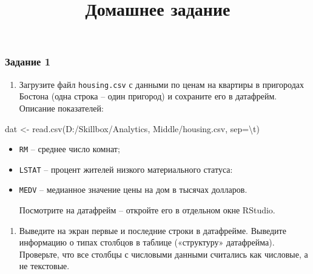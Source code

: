\documentclass[
]{article}
\title{Домашнее задание}
\author{}
\date{\vspace{-2.5em}}
\newenvironment{Shaded}{\begin{snugshade}}{\end{snugshade}}
\newcommand{\AttributeTok}[1]{\textcolor[rgb]{0.77,0.63,0.00}{#1}}
\newcommand{\FunctionTok}[1]{\textcolor[rgb]{0.00,0.00,0.00}{#1}}
\newcommand{\NormalTok}[1]{#1}
\newcommand{\OtherTok}[1]{\textcolor[rgb]{0.56,0.35,0.01}{#1}}
\newcommand{\SpecialCharTok}[1]{\textcolor[rgb]{0.00,0.00,0.00}{#1}}
\newcommand{\StringTok}[1]{\textcolor[rgb]{0.31,0.60,0.02}{#1}}
\providecommand{\tightlist}{%
  \setlength{\itemsep}{0pt}\setlength{\parskip}{0pt}}
\begin{document}
\maketitle

\hypertarget{ux437ux430ux434ux430ux43dux438ux435-1}{%
\subsubsection{Задание 1}\label{ux437ux430ux434ux430ux43dux438ux435-1}}

\begin{enumerate}
\def\labelenumi{\arabic{enumi}.}
\tightlist
\item
  Загрузите файл \texttt{housing.csv} с данными по ценам на квартиры в
  пригородах Бостона (одна строка -- один пригород) и сохраните его в
  датафрейм. Описание показателей:
\end{enumerate}

\begin{Shaded}
\begin{Highlighting}[]
\NormalTok{dat }\OtherTok{\textless{}{-}} \FunctionTok{read.csv}\NormalTok{(}\StringTok{\textquotesingle{}D:/Skillbox/Analytics, Middle/housing.csv\textquotesingle{}}\NormalTok{, }\AttributeTok{sep=}\StringTok{\textquotesingle{}}\SpecialCharTok{\textbackslash{}t}\StringTok{\textquotesingle{}}\NormalTok{)}
\end{Highlighting}
\end{Shaded}

\begin{itemize}
\item
  \texttt{RM} -- среднее число комнат;
\item
  \texttt{LSTAT} -- процент жителей низкого материального статуса:
\item
  \texttt{MEDV} -- медианное значение цены на дом в тысячах долларов.

  Посмотрите на датафрейм -- откройте его в отдельном окне RStudio.
\end{itemize}

\begin{enumerate}
\def\labelenumi{\arabic{enumi}.}
\setcounter{enumi}{1}
\tightlist
\item
  Выведите на экран первые и последние строки в датафрейме. Выведите
  информацию о типах столбцов в таблице («структуру» датафрейма).
  Проверьте, что все столбцы с числовыми данными считались как числовые,
  а не текстовые.
\end{enumerate}
\end{document}
